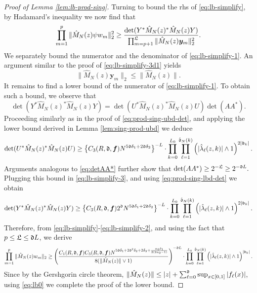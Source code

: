 \documentclass{amsart}
\numberwithin{equation}{section}
\def\corEE{\textcolor{amethyst}}
\def\corEE{}
\def\corAB{}
\def\corOZ{}
\def\corABrev{\textcolor{black}}
\newcommand{\abbr}[1]{{\sc\lowercase{#1}}}
\begin{document}
\begin{proof}[Proof of Lemma \ref{lem:lb-prod-sing}]
 Turning to bound the \abbr{RHS} \corOZ{of}
 \eqref{eq:lb-simplify}, by Hadamard's inequality we now find that
\begin{equation}\label{eq:lb-simplify-1}
\prod_{m=1}^p\| \hat{M}_N(z) {\psi} w_m\|_2^2 \ge \frac{\det(Y^* \hat{M}_{N}(z)^* \hat{M}_{N}(z) Y)}{\prod_{m=p+1}^{\mathfrak{L}} \|\hat{M}_{N}(z){\bm y}_m\|_2^2}.
\end{equation}
We separately bound the numerator and the denominator of \eqref{eq:lb-simplify-1}. \corAB{An argument similar to the proof of \eqref{eq:lb-simplify-3d1} yields}
\begin{equation}\label{eq:lb-simplify-2}
\corAB{\|\hat{M}_{N}(z) {\bm y}_m\|_2 \le  \|\hat{M}_{N}(z)\|.}
\end{equation}
It remains to find a lower bound of the numerator of \eqref{eq:lb-simplify-1}. To obtain such a bound, we observe that
\begin{equation}\label{eq:lb-simplify-3}
\det(Y^* \hat{M}_{N}(z)^* \hat{M}_{N}(z) Y)= \det(U^* \hat{M}_N(z)^* \hat{M}_N(z) U) \det(A A^*).%
\end{equation}
Proceeding similarly as in the proof of \eqref{eq:prod-sing-ubd-det}, and applying the lower bound derived in Lemma \ref{lem:sing-prod-ubd} we deduce
\begin{equation}\label{eq:prod-sing-lbd-det}
\det(U^*\hat{M}_N(z)^* \hat{M}_N(z) U) \ge   \left\{C_3(R,\mathfrak{d}, {\bm f}) N^{5\mathfrak{d} \delta_1+2\mathfrak{d} \delta_2}\right\}^{-L} \cdot \prod_{k=0}^{L_0} \prod_{\ell=1}^{\hat{\mathfrak{d}}_N(k)} \left(|\hat{\lambda}_\ell(z,k)| \wedge 1\right)^{2|\mathfrak{b}_k|}.
\end{equation}
Arguments analogous to \eqref{eq:detAA*} further show that \(
\det(A A^*)  \geq 2^{-\mathfrak{L}} \ge 2^{-\mathfrak{d} L}.
\)
Plugging this bound in \eqref{eq:lb-simplify-3}, and using \eqref{eq:prod-sing-lbd-det} we obtain
\[
\det(Y^* \hat{M}_{N}(z)^* \hat{M}_{N}(z) Y) \ge  \left\{C_3(R,\mathfrak{d}, {\bm f}) 2^{\mathfrak{d}} N^{5\mathfrak{d} \delta_1+2\mathfrak{d} \delta_2}\right\}^{-L} \cdot \prod_{k=0}^{L_0} \prod_{\ell=1}^{\hat{\mathfrak{d}}_N(k)} \left(|\hat{\lambda}_\ell(z,k)| \wedge 1\right)^{2|\mathfrak{b}_k|}.
\]
Therefore, from \eqref{eq:lb-simplify}-\eqref{eq:lb-simplify-2}, and using the fact that $p \le \mathfrak{L} \le \mathfrak{d} L$, we derive
\[
\prod_{m=1}^p   \|\hat{M}_{N}(z) w_m\|_2 \ge \left(\frac{C_1(R,\gd, {\bm f})C_3(R,\gd, {\bm f}) N^{5\gd \delta_1+2\corEE{\gd}^2\delta_2+2\delta_3+\corABrev{\frac{\alpha_0\delta_1}{2(2\alpha_0-1)}}}}{8(\|\hat{M}_{N}(z)\|\vee 1)}\right)^{-\corEE{\gd} L} \cdot \prod_{k=0}^{L_0} \prod_{\ell=1}^{\hat\gd_N(k)} \left(|\hat{\lambda}_\ell(z,k)| \wedge 1\right)^{|\gb_k|}.
\]
Since by \corOZ{the}
Gershgorin circle theorem, $\|\hat{M}_N(z)\| \le |z| + \sum_{\ell=0}^{\mathfrak{d}} \sup_{x \in [0,1]}|f_\ell(x)|$, using \eqref{eq:lb0} \corOZ{we complete}  the proof of the lower bound.
 \end{proof}
\end{document}
